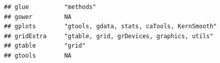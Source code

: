 \documentclass[]{article}
\begin{document}
\begin{verbatim}
## glue          "methods"                                                                                                                                                                                                                                                                                                                                                                                                                                                                             
## gower         NA                                                                                                                                                                                                                                                                                                                                                                                                                                                                                    
## gplots        "gtools, gdata, stats, caTools, KernSmooth"                                                                                                                                                                                                                                                                                                                                                                                                                                           
## gridExtra     "gtable, grid, grDevices, graphics, utils"                                                                                                                                                                                                                                                                                                                                                                                                                                            
## gtable        "grid"                                                                                                                                                                                                                                                                                                                                                                                                                                                                                
## gtools        NA                                                                                                                                                                                                                                                                                                                                                                                                                                                                                    

\end{verbatim}
\end{document}
